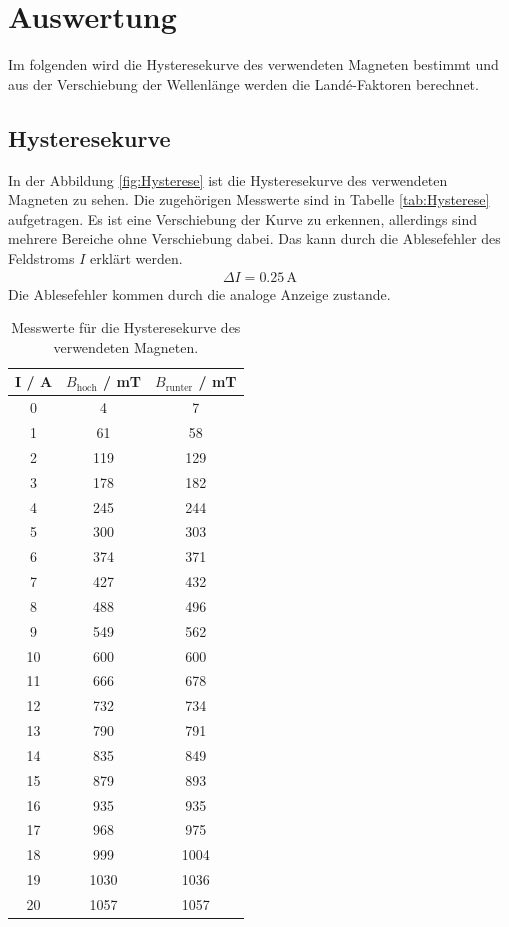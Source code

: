 \newpage
\section{Auswertung}
\label{sec:Auswertung}
Im folgenden wird die Hysteresekurve des verwendeten Magneten bestimmt und aus der Verschiebung der Wellenlänge werden die Landé-Faktoren berechnet.



\subsection{Hysteresekurve}
In der Abbildung \eqref{fig:Hysterese} ist die Hysteresekurve des verwendeten Magneten zu sehen. Die zugehörigen Messwerte sind in Tabelle \eqref{tab:Hysterese} aufgetragen. Es ist eine Verschiebung der Kurve zu erkennen, allerdings sind mehrere Bereiche ohne Verschiebung dabei. Das kann durch die Ablesefehler des Feldstroms $I$ erklärt werden.
\begin{align*}
  \Delta I = 0.25\, \text{A}
\end{align*}
Die Ablesefehler kommen durch die analoge Anzeige zustande.

\begin{table}
  \centering
  \caption{Messwerte für die Hysteresekurve des verwendeten Magneten.}
  \label{tab:Hysterese}
  \begin{tabular}{c | c c}
    I / A & $B_\text{hoch}$ / mT & $B_\text{runter}$ / mT \\
    \hline
    0 & 4 & 7 \\
    1 & 61 & 58 \\
    2 & 119 & 129 \\
    3 & 178 & 182 \\
    4 & 245 & 244 \\
    5 & 300 & 303 \\
    6 & 374 & 371 \\
    7 & 427 & 432 \\
    8 & 488 & 496 \\
    9 & 549 & 562 \\
    10 & 600 & 600 \\
    11 & 666 & 678 \\
    12 & 732 & 734 \\
    13 & 790 & 791 \\
    14 & 835 & 849 \\
    15 & 879 & 893 \\
    16 & 935 & 935 \\
    17 & 968 & 975 \\
    18 & 999 & 1004 \\
    19 & 1030 & 1036 \\
    20 & 1057 & 1057 \\
  \end{tabular}
\end{table}

